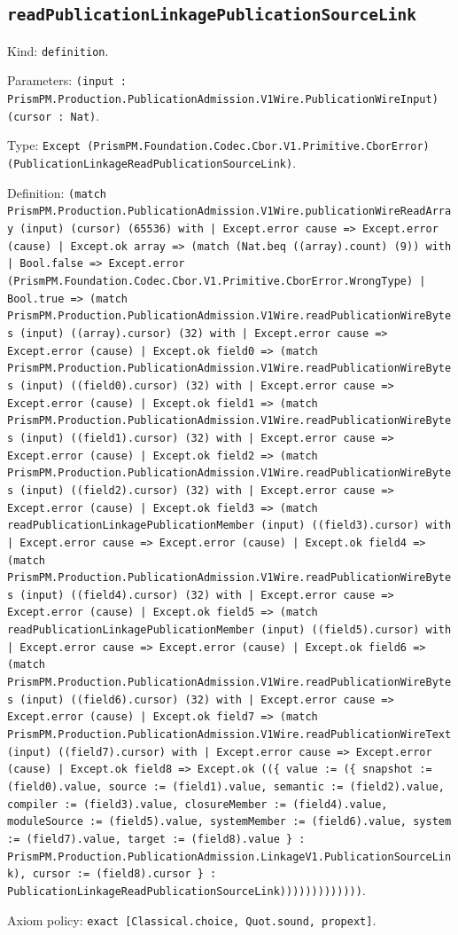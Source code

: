 \documentclass[11pt]{article}
\begin{document}
\subsection*{\texttt{readPublicationLinkagePublicationSourceLink}}
\noindent Kind: \texttt{definition}.\par
\noindent Parameters: \texttt{(input : PrismPM.Production.PublicationAdmission.V1Wire.PublicationWireInput) (cursor : Nat)}.\par
\noindent Type: \texttt{Except (PrismPM.Foundation.Codec.Cbor.V1.Primitive.CborError) (PublicationLinkageReadPublicationSourceLink)}.\par
\noindent Definition: \texttt{(match PrismPM.Production.PublicationAdmission.V1Wire.publicationWireReadArray (input) (cursor) (65536) with | Except.error cause => Except.error (cause) | Except.ok array => (match (Nat.beq ((array).count) (9)) with | Bool.false => Except.error (PrismPM.Foundation.Codec.Cbor.V1.Primitive.CborError.WrongType) | Bool.true => (match PrismPM.Production.PublicationAdmission.V1Wire.readPublicationWireBytes (input) ((array).cursor) (32) with | Except.error cause => Except.error (cause) | Except.ok field0 => (match PrismPM.Production.PublicationAdmission.V1Wire.readPublicationWireBytes (input) ((field0).cursor) (32) with | Except.error cause => Except.error (cause) | Except.ok field1 => (match PrismPM.Production.PublicationAdmission.V1Wire.readPublicationWireBytes (input) ((field1).cursor) (32) with | Except.error cause => Except.error (cause) | Except.ok field2 => (match PrismPM.Production.PublicationAdmission.V1Wire.readPublicationWireBytes (input) ((field2).cursor) (32) with | Except.error cause => Except.error (cause) | Except.ok field3 => (match readPublicationLinkagePublicationMember (input) ((field3).cursor) with | Except.error cause => Except.error (cause) | Except.ok field4 => (match PrismPM.Production.PublicationAdmission.V1Wire.readPublicationWireBytes (input) ((field4).cursor) (32) with | Except.error cause => Except.error (cause) | Except.ok field5 => (match readPublicationLinkagePublicationMember (input) ((field5).cursor) with | Except.error cause => Except.error (cause) | Except.ok field6 => (match PrismPM.Production.PublicationAdmission.V1Wire.readPublicationWireBytes (input) ((field6).cursor) (32) with | Except.error cause => Except.error (cause) | Except.ok field7 => (match PrismPM.Production.PublicationAdmission.V1Wire.readPublicationWireText (input) ((field7).cursor) with | Except.error cause => Except.error (cause) | Except.ok field8 => Except.ok ((\{ value := (\{ snapshot := (field0).value, source := (field1).value, semantic := (field2).value, compiler := (field3).value, closureMember := (field4).value, moduleSource := (field5).value, systemMember := (field6).value, system := (field7).value, target := (field8).value \} : PrismPM.Production.PublicationAdmission.LinkageV1.PublicationSourceLink), cursor := (field8).cursor \} : PublicationLinkageReadPublicationSourceLink)))))))))))))}.\par
\noindent Axiom policy: \texttt{exact [Classical.choice, Quot.sound, propext]}.\par
\end{document}
